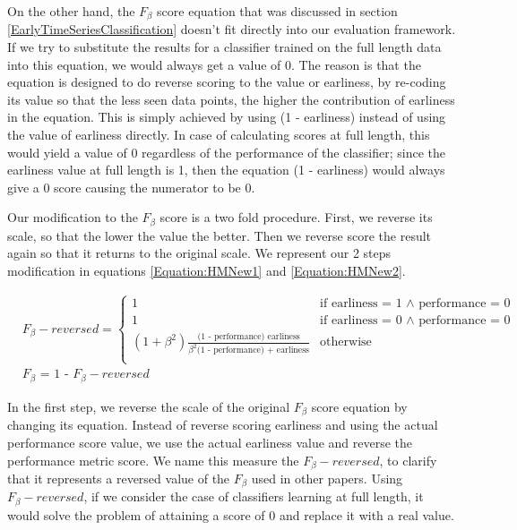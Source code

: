 On the other hand, the $F_{\beta}$ score equation that was discussed in section \ref{EarlyTimeSeriesClassification} doesn't fit directly into our evaluation framework.
If we try to substitute the results for a classifier trained on the full length data into this equation, we would always get a value of 0.
The reason is that the equation is designed to do reverse scoring to the value or earliness, by re-coding its value so that the less seen data points, the higher the contribution of earliness in the equation.
This is simply achieved by using (1 - earliness) instead of using the value of earliness directly.
In case of calculating scores at full length, this would yield a value of 0 regardless of the performance of the classifier;
since the earliness value at full length is 1, then the equation (1 - earliness) would always give a 0 score causing the numerator to be 0.

Our modification to the $F_{\beta}$ score is a two fold procedure.
First, we reverse its scale, so that the lower the value the better. Then we reverse score the result again so that it returns to the original scale.
We represent our 2 steps modification in equations \ref{Equation:HMNew1} and \ref{Equation:HMNew2}.

\begin{align}
    & F_{\beta}-reversed =
        \begin{cases}
          1 & \text{if earliness = 1 $\land$ performance = 0} \\
          1 & \text{if earliness = 0 $\land$ performance = 0} \\
          (1 + \beta^2)\frac{\text{(1 - performance) earliness}}{\beta^2 \text{(1 - performance) + earliness}} & \text{otherwise} \\
        \end{cases} \label{Equation:HMNew1} \\
    & F_{\beta} \text{ = 1 - } F_{\beta}-reversed \label{Equation:HMNew2}
\end{align}

In the first step, we reverse the scale of the original $F_{\beta}$ score equation by changing its equation.
Instead of reverse scoring earliness and using the actual performance score value, we use the actual earliness value and reverse the performance metric score.
We name this measure the $F_{\beta}-reversed$, to clarify that it represents a reversed value of the $F_{\beta}$ used in other papers.
Using $F_{\beta}-reversed$, if we consider the case of classifiers learning at full length, 
it would solve the problem of attaining a score of 0 and replace it with a real value.

